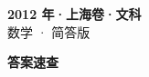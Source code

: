 \documentclass[zihao=-4, a4paper]{ctexart}
\begin{document}
\begin{center}
  {\Large\bfseries 2012 年·上海卷·文科}\\[4pt]
  {\large 数学 · 简答版}
\end{center}
\medskip
{}

\clearpage
{}
\begin{center}{\Large\bfseries 答案速查}\end{center}
\medskip

\end{document}
